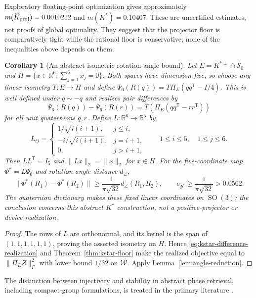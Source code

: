 \documentclass[12pt]{article}
\newtheorem{corollary}[theorem]{Corollary}
\theoremstyle{definition}
\theoremstyle{remark}
\newcommand{\RR}{\mathbb R}
\newcommand{\SO}{\operatorname{SO}}
\begin{document}
Exploratory floating-point optimization gives approximately
$m(\widehat K_{\rm proj})=0.0010212$ and $m(K^\ast)=0.10407$.
These are uncertified estimates, not proofs of global optimality. They
suggest that the projector floor is comparatively tight while the rational
floor is conservative; none of the inequalities above depends on them.

\begin{corollary}[An abstract isometric rotation-angle bound]
\label{cor:kstar-conditioning}
Let $E=K^{\ast\perp}\cap\mathcal S_0$ and
$H=\{x\in\RR^6:\sum_{j=1}^6x_j=0\}$.  Both spaces have dimension five,
so choose any linear isometry $T:E\to H$ and define
$\Psi_6(R(q))=T\Pi_E(qq^{\mathsf T}-I/4)$.
This is well defined under $q\sim-q$ and realizes pair differences by
\begin{equation}\label{eq:kstar-difference-realization}
 \Psi_6(R(q))-\Psi_6(R(r))
 =T\!\left(\Pi_E(qq^{\mathsf T}-rr^{\mathsf T})\right)
\end{equation}
for all unit quaternions $q,r$.  Define $L:\RR^6\to\RR^5$ by
\begin{equation}\label{eq:H-partial-isometry}
 L_{ij}=\begin{cases}
  1/\sqrt{i(i+1)},&j\leq i,\\
  -i/\sqrt{i(i+1)},&j=i+1,\\
  0,&j>i+1,
  \end{cases}
  \qquad 1\leq i\leq5,\quad 1\leq j\leq6.
\end{equation}
Then $LL^{\mathsf T}=I_5$ and $\|Lx\|_2=\|x\|_2$ for $x\in H$.  For the
five-coordinate map $\Phi^\ast=L\Psi_6$ and rotation-angle distance
$d_\angle$,
\[
 \|\Phi^\ast(R_1)-\Phi^\ast(R_2)\|
 \geq \frac{1}{\pi\sqrt{32}}d_\angle(R_1,R_2),
 \qquad
 c_{\Phi^\ast}\geq\frac{1}{\pi\sqrt{32}}>0.0562.
\]
The quaternion dictionary makes these fixed linear coordinates on $\SO(3)$;
the conclusion concerns this abstract $K^\ast$ construction, not a
positive-projector or device realization.
\end{corollary}

\begin{proof}
The rows of $L$ are orthonormal, and its kernel is the span of
$(1,1,1,1,1,1)$, proving the asserted isometry on $H$.  Hence
\eqref{eq:kstar-difference-realization} and
Theorem~\ref{thm:kstar-floor} make the realized objective equal to
$\|\Pi_EZ\|_F^2$ with lower bound $1/32$ on $\mathcal W$.  Apply
Lemma~\ref{lem:angle-reduction}.
\end{proof}

The distinction between injectivity and
stability in abstract phase retrieval, including compact-group formulations,
is treated in the primary literature
\cite{BandeiraCahillMixonNelson2014,XiaXuXu2024,AmirBendoryDymEdidin2025}.
\end{document}
